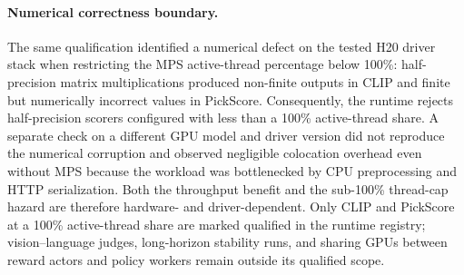 \paragraph{Numerical correctness boundary.}
The same qualification identified a numerical defect on the tested H20 driver stack when restricting the MPS active-thread percentage below 100\%: half-precision matrix multiplications produced non-finite outputs in CLIP and finite but numerically incorrect values in PickScore.
Consequently, the runtime rejects half-precision scorers configured with less than a 100\% active-thread share.
A separate check on a different GPU model and driver version did not reproduce the numerical corruption and observed negligible colocation overhead even without MPS because the workload was bottlenecked by CPU preprocessing and HTTP serialization.
Both the throughput benefit and the sub-100\% thread-cap hazard are therefore hardware- and driver-dependent.
Only CLIP and PickScore at a 100\% active-thread share are marked qualified in the runtime registry; vision--language judges, long-horizon stability runs, and sharing GPUs between reward actors and policy workers remain outside its qualified scope.
